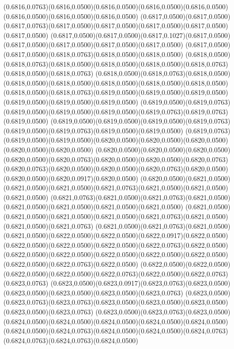 (0.6816,0.0763)(0.6816,0.0500)(0.6816,0.0500)(0.6816,0.0500)(0.6816,0.0500)(0.6816,0.0500)(0.6816,0.0500)(0.6816,0.0500)
(0.6817,0.0500)(0.6817,0.0500)(0.6817,0.0763)(0.6817,0.0500)(0.6817,0.0500)(0.6817,0.0500)(0.6817,0.0500)(0.6817,0.0500)
(0.6817,0.0500)(0.6817,0.0500)(0.6817,0.1027)(0.6817,0.0500)(0.6817,0.0500)(0.6817,0.0500)(0.6817,0.0500)(0.6817,0.0500)
(0.6817,0.0500)(0.6817,0.0500)(0.6818,0.0763)(0.6818,0.0500)(0.6818,0.0500)
\PST@Solid(0.6818,0.0500)(0.6818,0.0763)(0.6818,0.0500)(0.6818,0.0500)(0.6818,0.0500)(0.6818,0.0763)(0.6818,0.0500)(0.6818,0.0763)
(0.6818,0.0500)(0.6818,0.0763)(0.6818,0.0500)(0.6818,0.0500)(0.6818,0.0500)(0.6818,0.0500)(0.6818,0.0500)(0.6818,0.0500)
(0.6818,0.0500)(0.6818,0.0763)(0.6819,0.0500)(0.6819,0.0500)(0.6819,0.0500)(0.6819,0.0500)(0.6819,0.0500)(0.6819,0.0500)
(0.6819,0.0500)(0.6819,0.0763)(0.6819,0.0500)(0.6819,0.0500)(0.6819,0.0500)(0.6819,0.0763)(0.6819,0.0763)(0.6819,0.0500)
(0.6819,0.0500)(0.6819,0.0500)(0.6819,0.0500)(0.6819,0.0763)(0.6819,0.0500)(0.6819,0.0763)(0.6819,0.0500)(0.6819,0.0500)
(0.6819,0.0763)(0.6819,0.0500)(0.6819,0.0500)(0.6820,0.0500)(0.6820,0.0500)(0.6820,0.0500)(0.6820,0.0500)(0.6820,0.0500)
(0.6820,0.0500)(0.6820,0.0500)(0.6820,0.0500)(0.6820,0.0500)(0.6820,0.0763)(0.6820,0.0500)(0.6820,0.0500)(0.6820,0.0763)
(0.6820,0.0763)(0.6820,0.0500)(0.6820,0.0500)(0.6820,0.0763)(0.6820,0.0500)(0.6820,0.0500)(0.6820,0.0917)(0.6820,0.0500)
(0.6820,0.0500)(0.6821,0.0500)(0.6821,0.0500)(0.6821,0.0500)(0.6821,0.0763)(0.6821,0.0500)(0.6821,0.0500)(0.6821,0.0500)
(0.6821,0.0763)(0.6821,0.0500)(0.6821,0.0763)(0.6821,0.0500)(0.6821,0.0500)(0.6821,0.0500)(0.6821,0.0500)(0.6821,0.0500)
(0.6821,0.0500)(0.6821,0.0500)(0.6821,0.0500)(0.6821,0.0500)(0.6821,0.0763)(0.6821,0.0500)(0.6821,0.0500)(0.6821,0.0763)
(0.6821,0.0500)(0.6821,0.0763)(0.6821,0.0500)(0.6821,0.0500)(0.6822,0.0500)(0.6822,0.0500)(0.6822,0.0917)(0.6822,0.0500)
(0.6822,0.0500)(0.6822,0.0500)(0.6822,0.0500)(0.6822,0.0763)(0.6822,0.0500)
\PST@Solid(0.6822,0.0500)(0.6822,0.0500)(0.6822,0.0500)(0.6822,0.0500)(0.6822,0.0500)(0.6822,0.0500)(0.6822,0.0763)(0.6822,0.0500)
(0.6822,0.0500)(0.6822,0.0500)(0.6822,0.0500)(0.6822,0.0500)(0.6822,0.0763)(0.6822,0.0500)(0.6822,0.0763)(0.6823,0.0763)
(0.6823,0.0500)(0.6823,0.0917)(0.6823,0.0763)(0.6823,0.0500)(0.6823,0.0500)(0.6823,0.0500)(0.6823,0.0500)(0.6823,0.0763)
(0.6823,0.0500)(0.6823,0.0763)(0.6823,0.0763)(0.6823,0.0500)(0.6823,0.0500)(0.6823,0.0500)(0.6823,0.0500)(0.6823,0.0763)
(0.6823,0.0500)(0.6823,0.0763)(0.6823,0.0500)(0.6824,0.0500)(0.6824,0.0500)(0.6824,0.0500)(0.6824,0.0500)(0.6824,0.0500)
(0.6824,0.0500)(0.6824,0.0763)(0.6824,0.0500)(0.6824,0.0500)(0.6824,0.0763)(0.6824,0.0763)(0.6824,0.0763)(0.6824,0.0500)

